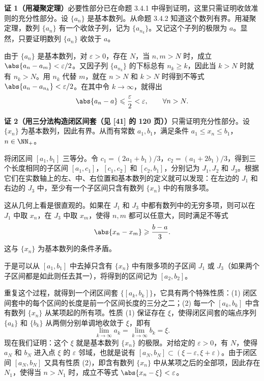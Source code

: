 \begin{xproof}
\textbf{证 1（用凝聚定理）}\quad 必要性部分已在命题 3.4.1 中得到证明，这里只需证明收敛准则的充分性部分。设 $\{a_n\}$ 是基本数列。从命题 3.4.2 知道这个数列有界。用凝聚定理，数列 $\{a_n\}$ 有一个收敛子列，记为 $\{a_{n_k}\}$。又记这个子列的极限为 $a$。显然，只要证明数列 $\{a_n\}$ 收敛于 $a$。

由于 $\{a_n\}$ 是基本数列，对 $\varepsilon>0$，存在 $N$，当 $n,m>N$ 时，成立 $\abs{a_n-a_m}<\varepsilon/2$。又因子列 $\{a_{n_k}\}$ 的下标总有 $n_k\geqslant k$，因此当 $k>N$ 时就有 $n_k>N$。用 $n_k$ 代替 $m$，就在 $n>N$ 和 $k>N$ 时得到不等式 $\abs{a_n-a_{n_k}}<\varepsilon/2$。在其中令 $k\to\infty$，就得出
\[
  \abs{a_n-a}\leqslant\frac\varepsilon2<\varepsilon,\qquad \forall n>N.
\]

\textbf{证 2（用三分法构造闭区间套（见 [41] 的 120 页））}\quad 只需证明充分性部分。设 $\{x_n\}$ 为基本数列，因此有界。从而有常数 $a_1,b_1$，满足条件 $a_1\leqslant x_n\leqslant b_1$，$n\in\NN_+$。

将闭区间 $[a_1,b_1]$ 三等分。令 $c_1=(2a_1+b_1)/3$，$c_2=(a_1+2b_1)/3$，得到三个长度相同的子区间 $[a_1,c_1]$，$[c_1,c_2]$ 和 $[c_2,b_1]$，分别记为 $J_1,J_2$ 和 $J_3$。根据它们在实数轴上的左、中、右位置和基本数列的定义就可以发现：在左边的 $J_1$ 和右边的 $J_3$ 中，至少有一个子区间只含有数列 $\{x_n\}$ 中的有限多项。

这从几何上看是很直观的。如果在 $J_1$ 和 $J_3$ 中都有数列中的无穷多项，则可以在 $J_1$ 中取 $x_n$，在 $J_3$ 中取 $x_m$，使得 $n,m$ 都可以任意大，同时满足不等式
\[
  \abs{x_n-x_m}\geqslant\frac{b-a}{3}.
\]
这与 $\{x_n\}$ 为基本数列的条件矛盾。

于是可以从 $[a_1,b_1]$ 中去掉只含有 $\{x_n\}$ 中有限多项的子区间 $J_1$ 或 $J_3$（如果两个子区间都是如此则任去其一），将得到的区间记为 $[a_2,b_2]$。

重复这个过程，就得到一个闭区间套 $\{[a_k,b_k]\}$，它具有两个特殊性质：(1) 闭区间套中的每个区间的长度是前一个区间长度的三分之二；(2) 每一个 $[a_k,b_k]$ 中含有数列 $\{x_n\}$ 从某项起的所有项。性质 (1) 保证存在 $\xi$，使得闭区间套的端点序列 $\{a_k\}$ 和 $\{b_k\}$ 从两侧分别单调地收敛于 $\xi$，即有
\[
  \lim_{k\to\infty}a_k=\lim_{k\to\infty}b_k=\xi.
\]
现在我们证明：这个 $\xi$ 就是基本数列 $\{x_n\}$ 的极限。对给定的 $\varepsilon>0$，有 $N$，使得 $a_N$ 和 $b_N$ 进入点 $\xi$ 的 $\varepsilon$ 邻域，也就是说有 $[a_N,b_N]\subset(\xi-\varepsilon,\xi+\varepsilon)$。由于闭区间 $[a_N,b_N]$ 又具有性质 (2)，即含有数列 $\{x_n\}$ 中从某项之后的全部项，因此存在 $N_1$，使得当 $n>N_1$ 时，成立不等式 $\abs{x_n-\xi}<\varepsilon$。
\end{xproof}

